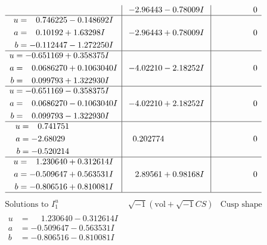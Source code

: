 \documentclass[1p]{elsarticle_modified}
\theoremstyle{definition}
\newcommand{\I}{\sqrt{-1}}
\begin{document}
$$\begin{array}{c|c|c}
 & -2.96443 - 0.78009 I & \phantom{-0.000000 } 0 \\ \hline\begin{aligned}
u &= \phantom{-}0.746225 - 0.148692 I \\
a &= \phantom{-}0.10192 + 1.63298 I \\
b &= -0.112447 - 1.272250 I\end{aligned}
 & -2.96443 + 0.78009 I & \phantom{-0.000000 } 0 \\ \hline\begin{aligned}
u &= -0.651169 + 0.358375 I \\
a &= \phantom{-}0.0686270 + 0.1063040 I \\
b &= \phantom{-}0.099793 + 1.322930 I\end{aligned}
 & -4.02210 - 2.18252 I & \phantom{-0.000000 } 0 \\ \hline\begin{aligned}
u &= -0.651169 - 0.358375 I \\
a &= \phantom{-}0.0686270 - 0.1063040 I \\
b &= \phantom{-}0.099793 - 1.322930 I\end{aligned}
 & -4.02210 + 2.18252 I & \phantom{-0.000000 } 0 \\ \hline\begin{aligned}
u &= \phantom{-}0.741751\phantom{ +0.000000I} \\
a &= -2.68029\phantom{ +0.000000I} \\
b &= -0.520214\phantom{ +0.000000I}\end{aligned}
 & \phantom{-}0.202774\phantom{ +0.000000I} & \phantom{-0.000000 } 0 \\ \hline\begin{aligned}
u &= \phantom{-}1.230640 + 0.312614 I \\
a &= -0.509647 + 0.563531 I \\
b &= -0.806516 + 0.810081 I\end{aligned}
 & \phantom{-}2.89561 + 0.98168 I & \phantom{-0.000000 } 0\\
 \hline 
 \end{array}$$\newpage$$\begin{array}{c|c|c}  
\text{Solutions to }I^u_{1}& \I (\text{vol} + \sqrt{-1}CS) & \text{Cusp shape}\\
 \hline 
\begin{aligned}
u &= \phantom{-}1.230640 - 0.312614 I \\
a &= -0.509647 - 0.563531 I \\
b &= -0.806516 - 0.810081 I\end{aligned}

\end{array}$$
\end{document}
